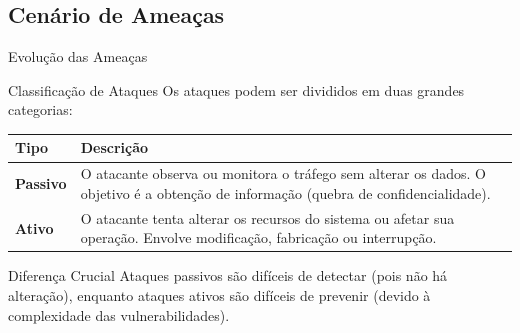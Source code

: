 \documentclass[aspectratio=169]{beamer}
\begin{document}
\subsection{Cenário de Ameaças}
\begin{frame}{Evolução das Ameaças}
    \centering
\end{frame}

\begin{frame}{Classificação de Ataques}
    Os ataques podem ser divididos em duas grandes categorias:
    \centering
    \small
    \begin{tabular}{lp{9cm}}
        \hline
        \textbf{Tipo} & \textbf{Descrição} \\
        \hline
        \textbf{Passivo} & O atacante observa ou monitora o tráfego sem alterar os dados. O objetivo é a obtenção de informação (quebra de confidencialidade). \\
        \textbf{Ativo} & O atacante tenta alterar os recursos do sistema ou afetar sua operação. Envolve modificação, fabricação ou interrupção. \\
        \hline
    \end{tabular}
    \vspace{0.4cm}
    \begin{exampleblock}{Diferença Crucial}
        Ataques passivos são difíceis de detectar (pois não há alteração), enquanto ataques ativos são difíceis de prevenir (devido à complexidade das vulnerabilidades).
    \end{exampleblock}
\end{frame}
\end{document}

